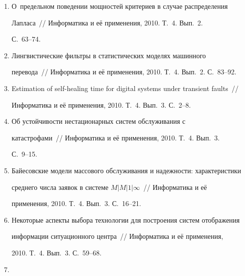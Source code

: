 \begin{enumerate}[1.]
С.~13--24.


\item {}


 О~предельном поведении мощностей критериев в случае распределения 


Лапласа~/\!\!/  Информатика и её применения, 2010. Т.~4. Вып.~2. 


С.~63--74.


\item {}


Лингвистические фильтры в статистических моделях машинного 


перевода~/\!\!/  Информатика и её применения, 2010. Т.~4. Вып.~2. С.~83--92.


\item {}


Estimation of self-healing time for digital systems under transient faults~/\!\!/  


Информатика и её применения, 2010. Т.~4. Вып.~3. С.~2--8.


\item {} 


Об устойчивости нестационарных систем обслуживания с 


катастрофами~/\!\!/  Информатика и её применения, 2010. Т.~4. Вып.~3. 


С.~9--15.


\item {}


Байесовские модели массового обслуживания и надежности: характеристики 


среднего числа заявок в системе $M|M|1|\infty$~/\!\!/  Информатика и её 


применения, 2010. Т.~4. Вып.~3. С.~16--21.


\item {}


Некоторые аспекты выбора технологии для построения систем отображения 


информации ситуационного центра~/\!\!/  Информатика и её применения, 


2010. Т.~4. Вып.~3. С.~59--68.





\item {}



\end{enumerate}
